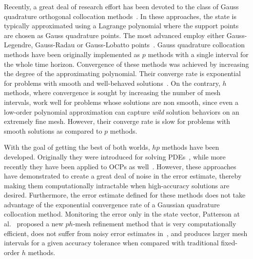 Recently, a great deal of research effort has been devoted to the class of Gauss quadrature orthogonal collocation methods~\cite{Elnager:TAC:1995,Fahroo:JGCD:2002,Garg:Automatica:2010,Darby:JSR:2011,Darby:OCAM:2011}. In these approaches, the state is typically approximated using a Lagrange polynomial where the support points are chosen as Gauss quadrature points. The most advanced employ either Gauss-Legendre, Gauss-Radau or Gauss-Lobatto points~\cite{Biegler:book:2010}. Gauss quadrature collocation methods have been originally implemented as $p$ methods with a single interval for the whole time horizon. Convergence of these methods was achieved by increasing the degree of the approximating polynomial. Their converge rate is exponential for problems with smooth and well-behaved solutions~\cite{Canuto:book:1988,Fornberg:book:1996}. On the contrary, $h$ methods, where convergence is sought by increasing the number of mesh intervals, work well for problems whose solutions are non smooth, since even a low-order polynomial approximation can capture \emph{wild} solution behaviors on an extremely fine mesh. However, their converge rate is slow for problems with smooth solutions as compared to $p$ methods.

With the goal of getting the best of both worlds, $hp$ methods have been developed. Originally they were introduced for solving PDEs~\cite{Babuska:CMAME:1990}, while more recently they have been applied to OCPs as well~\cite{Darby:OCAM:2011,Darby:JSR:2011}. However, these approaches have demonstrated to create a great deal of noise in the error estimate, thereby making them computationally intractable when high-accuracy solutions are desired. Furthermore, the error estimate defined for these methods does not take advantage of the exponential convergence rate of a Gaussian quadrature collocation method.
Monitoring the error only in the state vector, Patterson at al.~\cite{Patterson:OCAM:2015} proposed a new $ph$-mesh refinement method that is very computationally efficient, does not suffer from noisy error estimates in~\cite{Darby:JSR:2011}, and produces larger mesh intervals for a given accuracy tolerance when compared with traditional fixed-order $h$ methods.

